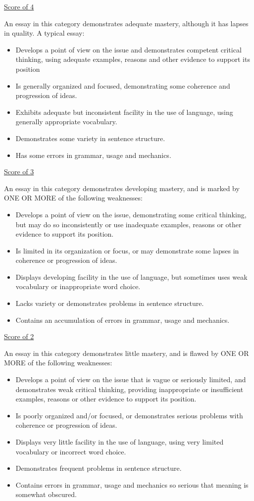 \vfill
\newpage
\underline{Score of 4}

An essay in this category demonstrates adequate mastery, although it has lapses in quality. A typical essay:
\begin{itemize}
\item{Develops a point of view on the issue and demonstrates competent critical thinking, using adequate examples, reasons and other evidence to support its position}
\item{Is generally organized and focused, demonstrating some coherence and progression of ideas.}
\item{Exhibits adequate but inconsistent facility in the use of language, using generally appropriate vocabulary.}
\item{Demonstrates some variety in sentence structure.}
\item{Has some errors in grammar, usage and mechanics.}
\end{itemize}

\vfill
\underline{Score of 3}

An essay in this category demonstrates developing mastery, and is marked by ONE OR MORE of the following weaknesses:

\begin{itemize}
\item{Develops a point of view on the issue, demonstrating some critical thinking, but may do so inconsistently or use inadequate examples, reasons or other evidence to support its position.}
\item{Is limited in its organization or focus, or may demonstrate some lapses in coherence or progression of ideas.}
\item{Displays developing facility in the use of language, but sometimes uses weak vocabulary or inappropriate word choice.}
\item{Lacks variety or demonstrates problems in sentence structure.}
\item{Contains an accumulation of errors in grammar, usage and mechanics.}
\end{itemize}

\vfill
\underline{Score of 2}

An essay in this category demonstrates little mastery, and is flawed by ONE OR MORE of the following weaknesses:

\begin{itemize}
\item{Develops a point of view on the issue that is vague or seriously limited, and demonstrates weak critical thinking, providing inappropriate or insufficient examples, reasons or other evidence to support its position.}
\item{Is poorly organized and/or focused, or demonstrates serious problems with coherence or progression of ideas.}
\item{Displays very little facility in the use of language, using very limited vocabulary or incorrect word choice.}
\item{Demonstrates frequent problems in sentence structure.}
\item{Contains errors in grammar, usage and mechanics so serious that meaning is somewhat obscured.}
\end{itemize}

